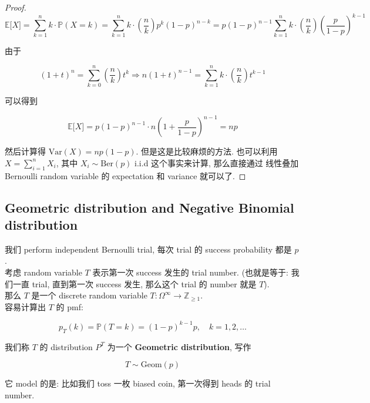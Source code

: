 \documentclass{qlnotes-export}
\begin{document}
\begin{proof}

\[{\mathbb{E}}\lbrack X\rbrack = \sum\limits_{k = 1}^{n}k \cdot {\mathbb{P}}(X = k) = \sum\limits_{k = 1}^{n}k \cdot \left( \frac{n}{k} \right)p^{k}(1 - p)^{n - k} = p(1 - p)^{n - 1}\sum\limits_{k = 1}^{n}k \cdot \left( \frac{n}{k} \right)(\frac{p}{1 - p})^{k - 1}\]

由于

\[(1 + t)^{n} = \sum\limits_{k = 0}^{n}\left( \frac{n}{k} \right)t^{k}\Longrightarrow n(1 + t)^{n - 1} = \sum\limits_{k = 1}^{n}k \cdot \left( \frac{n}{k} \right)t^{k - 1}\]

可以得到

\[{\mathbb{E}}\lbrack X\rbrack = p(1 - p)^{n - 1} \cdot n(1 + \frac{p}{1 - p})^{n - 1} = np\]

然后计算得 \(\text{Var}(X) = np(1 - p)\). 但是这是比较麻烦的方法. 也可以利用 \(X = \sum_{i = 1}^{n}X_{i}\), 其中 \(X_{i} \sim \text{Ber}(p)\) i.i.d 这个事实来计算, 那么直接通过 线性叠加 Bernoulli random variable 的 expectation 和 variance 就可以了.

\end{proof}

\subsection{Geometric distribution and Negative Binomial distribution}\label{geometric-distribution-and-negative-binomial-distribution}

\begin{example}\label{ex-02-random-variables-geometric-distribution}

我们 perform independent Bernoulli trial, 每次 trial 的 success probability 都是 \(p\).\\
考虑 random variable \(T\) 表示第一次 success 发生的 trial number. (也就是等于: 我们一直 trial, 直到第一次 success 发生, 那么这个 trial 的 number 就是 \(T\)).\\
那么 \(T\) 是一个 discrete random variable \(T:\Omega^{\infty}\rightarrow{\mathbb{Z}}_{\geq 1}\).\\
容易计算出 \(T\) 的 pmf:

\[p_{T}(k) = {\mathbb{P}}(T = k) = (1 - p)^{k - 1}p,\quad k = 1,2,\ldots\]

我们称 \(T\) 的 distribution \(P^{T}\) 为一个 \textbf{Geometric distribution}, 写作

\[T \sim \text{Geom}(p)\]

它 model 的是: 比如我们 toss 一枚 biased coin, 第一次得到 heads 的 trial number.\\

\end{example}
\end{document}
